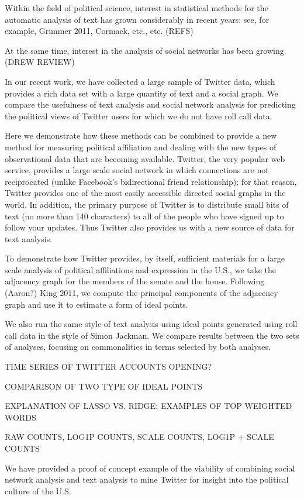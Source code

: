 Within the field of political science, interest in statistical methods for the automatic analysis of text has grown considerably in recent years: see, for example, Grimmer 2011, Cormack, etc., etc. (REFS)

At the same time, interest in the analysis of social networks has been growing. (DREW REVIEW)

In our recent work, we have collected a large sample of Twitter data, which provides a rich data set with a large quantity of text and a social graph. We compare the usefulness of text analysis and social network analysis for predicting the political views of Twitter users for which we do not have roll call data.

Here we demonstrate how these methods can be combined to provide a new method for measuring political affiliation and dealing with the new types of observational data that are becoming available. Twitter, the very popular web service, provides a large scale social network in which connections are not reciprocated (unlike Facebook's bidirectional friend relationship); for that reason, Twitter provides one of the most easily accessible directed social graphs in the world. In addition, the primary purpose of Twitter is to distribute small bits of text (no more than 140 characters) to all of the people who have signed up to follow your updates. Thus Twitter also provides us with a new source of data for text analysis.

To demonstrate how Twitter provides, by itself, sufficient materials for a large scale analysis of political affiliations and expression in the U.S., we take the adjacency graph for the members of the senate and the house. Following (Aaron?) King 2011, we compute the principal components of the adjacency graph and use it to estimate a form of ideal points. 

We also run the same style of text analysis using ideal points generated using roll call data in the style of Simon Jackman. We compare results between the two sets of analyses, focusing on commonalities in terms selected by both analyses.

TIME SERIES OF TWITTER ACCOUNTS OPENING?

COMPARISON OF TWO TYPE OF IDEAL POINTS

EXPLANATION OF LASSO VS. RIDGE: EXAMPLES OF TOP WEIGHTED WORDS

RAW COUNTS, LOG1P COUNTS, SCALE COUNTS, LOG1P + SCALE COUNTS

We have provided a proof of concept example of the viability of combining social network analysis and text analysis to mine Twitter for insight into the political culture of the U.S.
